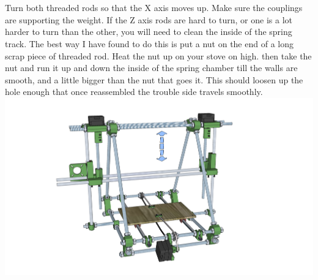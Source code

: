 \documentclass[twoside,openany,a4paper,titlepage]{memoir}
\begin{document}
	\section{}
	Turn both threaded rods so that the X axis moves up. Make sure the couplings are supporting the
	weight. If the Z axis rods are hard to turn, or one is a lot harder to turn than the other, you will need to
	clean the inside of the spring track. The best way I have found to do this is put a nut on the end of a
	long scrap piece of threaded rod. Heat the nut up on your stove on high. then take the nut and run it up
	and down the inside of the spring chamber till the walls are smooth, and a little bigger than the nut that
	goes it. This should loosen up the hole enough that once reassembled the trouble side travels
	smoothly.\\
	\includegraphics[width=1\linewidth]{graphics/ch8_23.png}
	
\end{document}
